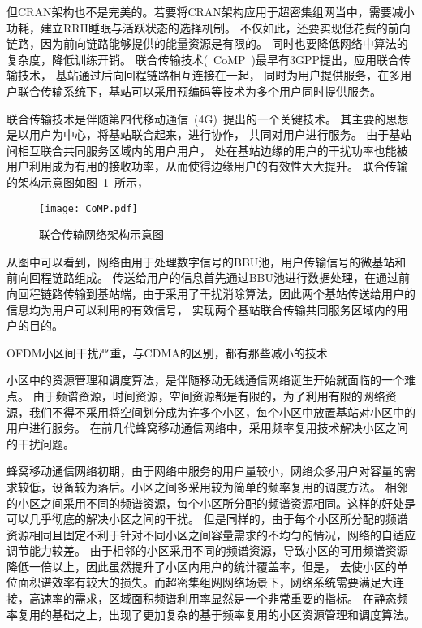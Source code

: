 但CRAN架构也不是完美的。若要将CRAN架构应用于超密集组网当中，需要减小功耗，建立RRH睡眠与活跃状态的选择机制。
不仅如此，还要实现低花费的前向链路，因为前向链路能够提供的能量资源是有限的。
同时也要降低网络中算法的复杂度，降低训练开销。
联合传输技术(~CoMP~)最早有3GPP提出，应用联合传输技术，
基站通过后向回程链路相互连接在一起，
同时为用户提供服务，在多用户联合传输系统下，基站可以采用预编码等技术为多个用户同时提供服务。

联合传输技术是伴随第四代移动通信~(4G)~提出的一个关键技术。
其主要的思想是以用户为中心，将基站联合起来，进行协作，
共同对用户进行服务。
由于基站间相互联合共同服务区域内的用户用户，
处在基站边缘的用户的干扰功率也能被用户利用成为有用的接收功率，从而使得边缘用户的有效性大大提升。
联合传输的架构示意图如图~\ref{CoMP}~所示，
\begin{figure}[htbp]
\centering
\texttt{[image: CoMP.pdf]}
\caption{联合传输网络架构示意图}\vspace{-0.5em}
\label{CoMP}
\end{figure}
从图中可以看到，网络由用于处理数字信号的BBU池，用户传输信号的微基站和前向回程链路组成。
传送给用户的信息首先通过BBU池进行数据处理，在通过前向回程链路传输到基站端，由于采用了干扰消除算法，因此两个基站传送给用户的信息均为用户可以利用的有效信号，
实现两个基站联合传输共同服务区域内的用户的目的。

OFDM小区间干扰严重，与CDMA的区别，都有那些减小的技术

小区中的资源管理和调度算法，是伴随移动无线通信网络诞生开始就面临的一个难点。
由于频谱资源，时间资源，空间资源都是有限的，为了利用有限的网络资源，我们不得不采用将空间划分成为许多个小区，每个小区中放置基站对小区中的用户进行服务。
在前几代蜂窝移动通信网络中，采用频率复用技术解决小区之间的干扰问题。

蜂窝移动通信网络初期，由于网络中服务的用户量较小，网络众多用户对容量的需求较低，设备较为落后。小区之间多采用较为简单的频率复用的调度方法。
相邻的小区之间采用不同的频谱资源，每个小区所分配的频谱资源相同。这样的好处是可以几乎彻底的解决小区之间的干扰。
但是同样的，由于每个小区所分配的频谱资源相同且固定不利于针对不同小区之间容量需求的不均匀的情况，网络的自适应调节能力较差。
由于相邻的小区采用不同的频谱资源，导致小区的可用频谱资源降低一倍以上，因此虽然提升了小区内用户的统计覆盖率，但是，
去使小区的单位面积谱效率有较大的损失。而超密集组网网络场景下，网络系统需要满足大连接，高速率的需求，区域面积频谱利用率显然是一个非常重要的指标。
在静态频率复用的基础之上，出现了更加复杂的基于频率复用的小区资源管理和调度算法。

